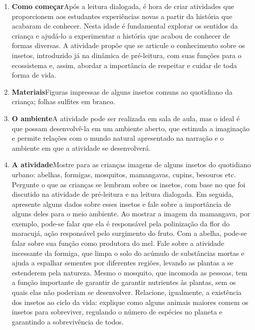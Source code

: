 \documentclass[11pt]{extarticle}
\begin{document}


\begin{enumerate}
\item \textbf{Como começar}\quad Após a leitura dialogada, é hora de criar 
atividades que proporcionem aos estudantes experiências novas a partir da história 
que acabaram de conhecer. Nesta idade é fundamental explorar os sentidos da criança e 
ajudá-lo a experimentar a história que acabou de conhecer de formas diversas. 
A atividade propõe que se articule o conhecimento sobre os insetos, introduzido já na dinâmica de pré-leitura, com suas funções para o ecossistema e, assim, abordar a importância de respeitar e cuidar de toda forma de vida. 

\item \textbf{Materiais}\quad Figuras impressas de alguns insetos comuns ao quotidiano da criança; folhas sulfites em branco. 

\item \textbf{O ambiente}\quad A atividade pode ser realizada em sala de aula, mas o ideal é que possam desenvolvê-la em um ambiente aberto, que estimula a imaginação e permite relações com o mundo natural apresentado na narração e o ambiente em que a atividade se desenvolverá.

\item \textbf{A atividade}\quad Mostre para as crianças imagens de alguns insetos do quotidiano urbano: abelhas, formigas, mosquitos, mamangavas, cupins, besouros etc.
Pergunte o que as crianças se lembram sobre os insetos, com base no que foi discutido na atividade de pré-leitura e na leitura dialogada. Em seguida, apresente alguns dados sobre esses insetos e fale sobre a importância de alguns deles para o meio ambiente. Ao mostrar a imagem da mamangava, por exemplo, pode-se falar que ela é responsável pela polinização da flor do maracujá, ação responsável pelo surgimento do fruto. Com a abelha, pode-se falar sobre sua função como produtora do mel. Fale sobre a atividade incessante da formiga, que limpa o solo do acúmulo de substâncias mortas e ajuda a espalhar sementes por diferentes regiões, levando as plantas a se estenderem pela natureza. Mesmo o mosquito, que incomoda as pessoas, tem a função importante de garantir de garantir nutrientes às plantas, sem os quais elas não poderiam se desenvolver. Relacione, igualmente, a existência dos insetos ao ciclo da vida: explique como alguns animais maiores comem os insetos para sobreviver, regulando o número de espécies no planeta e garantindo a sobrevivência de todos.


\end{enumerate}
\end{document}
